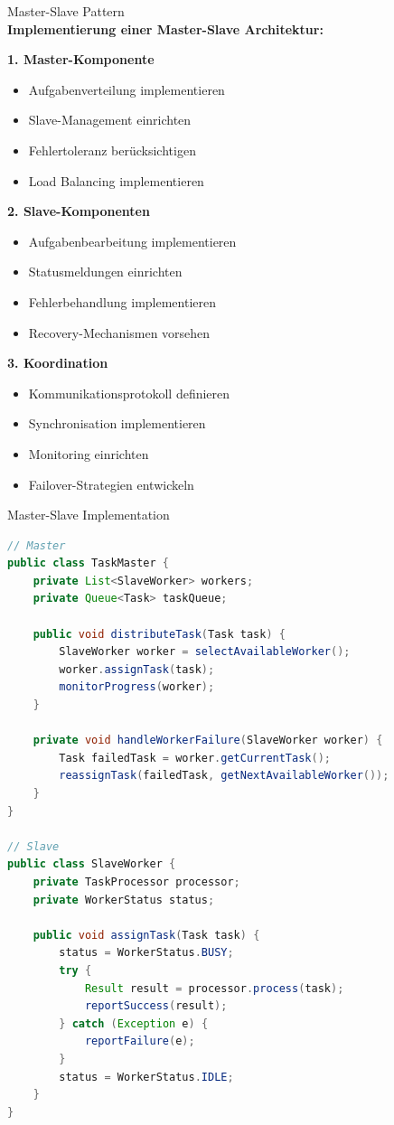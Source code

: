 \begin{KR}{Master-Slave Pattern}\\
\textbf{Implementierung einer Master-Slave Architektur:}

\textbf{1. Master-Komponente}
\begin{itemize}
    \item Aufgabenverteilung implementieren
    \item Slave-Management einrichten
    \item Fehlertoleranz berücksichtigen
    \item Load Balancing implementieren
\end{itemize}

\textbf{2. Slave-Komponenten}
\begin{itemize}
    \item Aufgabenbearbeitung implementieren
    \item Statusmeldungen einrichten
    \item Fehlerbehandlung implementieren
    \item Recovery-Mechanismen vorsehen
\end{itemize}

\textbf{3. Koordination}
\begin{itemize}
    \item Kommunikationsprotokoll definieren
    \item Synchronisation implementieren
    \item Monitoring einrichten
    \item Failover-Strategien entwickeln
\end{itemize}
\end{KR}

\begin{example2}{Master-Slave Implementation}
\begin{lstlisting}[language=Java, style=basesmol]
// Master
public class TaskMaster {
    private List<SlaveWorker> workers;
    private Queue<Task> taskQueue;
    
    public void distributeTask(Task task) {
        SlaveWorker worker = selectAvailableWorker();
        worker.assignTask(task);
        monitorProgress(worker);
    }
    
    private void handleWorkerFailure(SlaveWorker worker) {
        Task failedTask = worker.getCurrentTask();
        reassignTask(failedTask, getNextAvailableWorker());
    }
}

// Slave
public class SlaveWorker {
    private TaskProcessor processor;
    private WorkerStatus status;
    
    public void assignTask(Task task) {
        status = WorkerStatus.BUSY;
        try {
            Result result = processor.process(task);
            reportSuccess(result);
        } catch (Exception e) {
            reportFailure(e);
        }
        status = WorkerStatus.IDLE;
    }
}
\end{lstlisting}
\end{example2}

